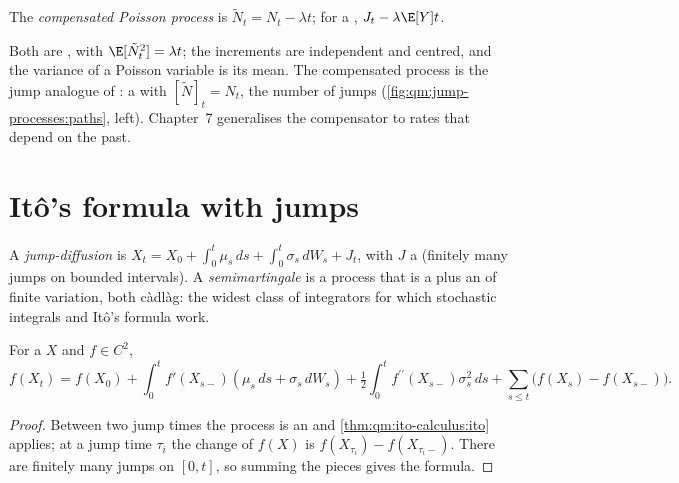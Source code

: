 \begin{definition}\label{def:qm:jump-processes:compensated}
The \emph{compensated Poisson process} is $\tilde N_t = N_t - \lambda
t$; for a , $J_t - \lambda\E[Y]t$.
\end{definition}

Both are , with $\E[\tilde N_t^2] = \lambda t$; the increments are independent and centred,
and the variance of a Poisson variable is its mean. The compensated process is the jump analogue
of : a  with  $[\tilde N]_t = N_t$, the number of jumps
(\cref{fig:qm:jump-processes:paths}, left). Chapter~7 generalises the compensator to rates that
depend on the past.

\section{Itô's formula with jumps}

\begin{definition}\label{def:qm:jump-processes:jd}
A \emph{jump-diffusion} is $X_t = X_0 + \int_0^t\mu_s\,ds + \int_0^t\sigma_s\,dW_s + J_t$,
with $J$ a  (finitely many jumps on bounded intervals). A
\emph{semimartingale} is a process that is a  plus an  of finite variation, both càdlàg: the widest class of integrators for which stochastic
integrals and Itô's formula work.
\end{definition}

\begin{theorem}\label{thm:qm:jump-processes:ito}
For a  $X$ and $f \in C^2$,
\[
f(X_t) = f(X_0) + \int_0^tf'(X_{s-})(\mu_s\,ds + \sigma_s\,dW_s) + \tfrac12\int_0^tf^{\prime\prime}(X_{s-})\sigma_s^2\,ds +
\sum_{s \le t}\bigl(f(X_s) - f(X_{s-})\bigr).
\]
\end{theorem}

\begin{proof}
Between two jump times the process is an  and \cref{thm:qm:ito-calculus:ito} applies; at
a jump time $\tau_i$ the change of $f(X)$ is $f(X_{\tau_i}) - f(X_{\tau_i -})$. There are finitely many jumps
on $[0, t]$, so summing the pieces gives the formula.
\end{proof}

